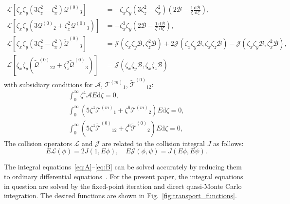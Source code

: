 \documentclass[]{jfm}
\newcommand{\dd}{\mathrm{d}}
\newcommand{\der}[2][]{\frac{\dd#1}{\dd#2}}
\newcommand{\Q}{\ensuremath{\mathcal{Q}^{(0)}}}
\newcommand{\T}[1]{\ensuremath{\mathcal{T}^{(#1)}}}
\newcommand{\TT}{\ensuremath{\tilde{\mathcal{T}}^{(0)}}}
\newcommand{\QQ}{\ensuremath{\tilde{\mathcal{Q}}^{(0)}}}
\begin{document}
\begin{align}
    \mathcal{L}\left[ \zeta_x\zeta_y \left( 3\zeta_z^2-\zeta_x^2 \right)\Q_3 \right]
        &= -\zeta_x\zeta_y\left( 3\zeta_z^2-\zeta_x^2 \right)\left(2\mathcal{B} - \frac1\zeta\der[\mathcal{B}]{\zeta}\right), \label{eq:Q3}\\
    \mathcal{L}\left[ \zeta_x\zeta_y \left( 3\Q_2+\zeta_x^2\Q_3 \right) \right]
        &= -\zeta_x^3\zeta_y\left(2\mathcal{B} - \frac1\zeta\der[\mathcal{B}]{\zeta}\right), \label{eq:Q2}\\
    \mathcal{L}\left[ \zeta_x\zeta_y\left( 3\zeta_z^2 - \zeta_x^2 \right)\QQ_3 \right]
        &= \mathcal{J}\left( \zeta_x\zeta_y\mathcal{B}, \zeta_z^2\mathcal{B} \right)
        + 2\mathcal{J}\left( \zeta_x\zeta_y\mathcal{B}, \zeta_x\zeta_z\mathcal{B} \right)
        - \mathcal{J}\left( \zeta_x\zeta_y\mathcal{B}, \zeta_x^2\mathcal{B} \right), \label{eq:QQ3}\\
    \mathcal{L}\left[ \zeta_x\zeta_y \left( \QQ_{22} + \zeta_z^2\QQ_3 \right) \right]
        &= \mathcal{J}\left( \zeta_x\zeta_y\mathcal{B}, \zeta_x\zeta_z\mathcal{B} \right) \label{eq:QQ2}
\end{align}
with subsidiary conditions for \(\mathcal{A}\), \(\T{m}_1\), \(\TT_{12}\):
\begin{gather}
    \int_0^\infty \zeta^4 \mathcal{A} E \dd\zeta = 0, \label{eq:A_constraint}\\
    \int_0^\infty \left( 5\zeta^4\T{m}_1 + \zeta^6\T{m}_2 \right) E \dd\zeta = 0, \label{eq:Tm_constraint}\\
    \int_0^\infty \left( 5\zeta^4\TT_{12} + \zeta^6\TT_2 \right) E \dd\zeta = 0, \label{eq:T12_constraint}
\end{gather}
The collision operators \(\mathcal{L}\) and \(\mathcal{J}\) are related to the collision integral \(J\) as follows:
\begin{equation}\label{eq:mathcalLJ}
    E\mathcal{L}(\phi) = 2J(1, E\phi), \quad E\mathcal{J}(\phi, \psi) = J(E\phi, E\psi).
\end{equation}

The integral equations~\eqref{eq:A}--\eqref{eq:B} can be solved accurately
by reducing them to ordinary differential equations~\citep[see e.g.][]{Pekeris1957, Ohwada1992}.
For the present paper, the integral equations in question are solved
by the fixed-point iteration and direct quasi-Monte Carlo integration.
The desired functions are shown in Fig.~\ref{fig:transport_functions}.
\end{document}

